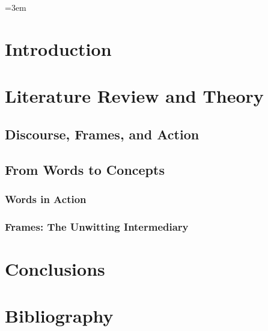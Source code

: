 \documentclass[11pt, letterpaper, titlepage]{report}
\begin{document}
\renewcommand{\thepage}{\arabic{page}}%
\setcounter{page}{1}  %
\setlength{\parskip}{0em}  %
\raggedright %
\parindent=3em %

\chapter{Introduction}
\thispagestyle{empty} %
\setcounter{footnote}{0}

\lipsum[3]

\newpage
\chapter{Literature Review and Theory}
\setcounter{footnote}{0}

\lipsum[2]

\section{Discourse, Frames, and Action} 
\lipsum[1]

	\section{From Words to Concepts}
	\lipsum[1]

		\subsection{Words in Action}
		\lipsum[1]
		
		\subsection{Frames:  The Unwitting Intermediary}  
		
 		\lipsum[1]
	


\newpage
\chapter{Conclusions}
\setcounter{footnote}{0}

\lipsum[1]

\newpage

\chapter*{Bibliography}
	\singlespacing
	\nocite{*}
	\setlength\bibitemsep{\baselineskip}
	\printbibliography[heading=none]
\end{document}
